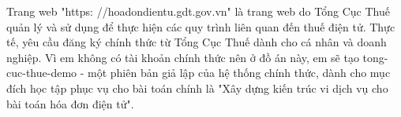 Trang web "https: //hoadondientu.gdt.gov.vn" là trang web do Tổng Cục Thuế quản lý và sử dụng để thực hiện các quy trình liên quan đến thuế điện tử. Thực tế, yêu cầu đăng ký chính thức từ Tổng Cục Thuế dành cho cá nhân và doanh nghiệp. Vì em không có tài khoản chính thức nên ở đồ án này, em sẽ tạo  tong-cuc-thue-demo - một phiên bản giả lập của hệ thống chính thức, dành cho mục đích học tập phục vụ cho bài toán chính là "Xây dựng kiến trúc vi dịch vụ cho bài toán hóa đơn điện tử".
